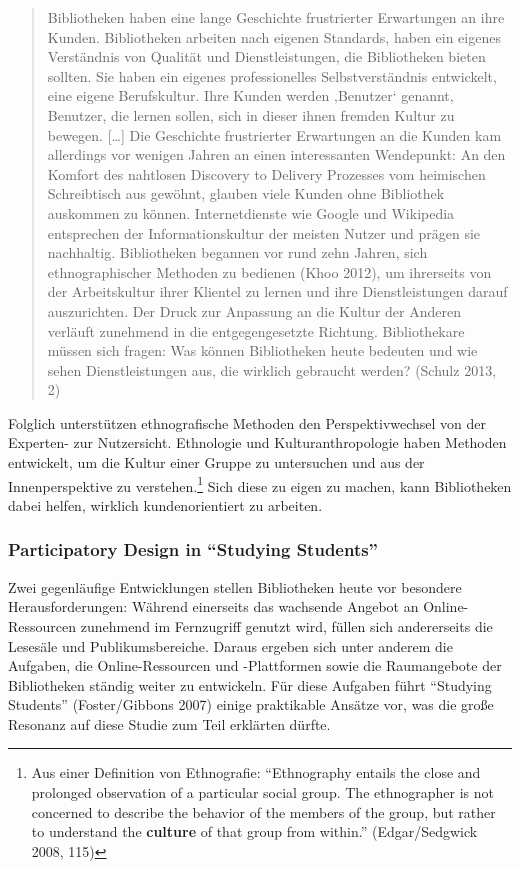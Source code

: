 \documentclass[a4paper,
fontsize=11pt,
oneside,
numbers=noperiodatend,
parskip=half-,
bibliography=totoc,
final
]{scrartcl}
\begin{document}
\begin{quote}
Bibliotheken haben eine lange Geschichte frustrierter Erwartungen an
ihre Kunden. Bibliotheken arbeiten nach eigenen Standards, haben ein
eigenes Verständnis von Qualität und Dienstleistungen, die Bibliotheken
bieten sollten. Sie haben ein eigenes professionelles Selbstverständnis
entwickelt, eine eigene Berufskultur. Ihre Kunden werden ‚Benutzer`
genannt, Benutzer, die lernen sollen, sich in dieser ihnen fremden
Kultur zu bewegen. {[}\ldots{}{]} Die Geschichte frustrierter
Erwartungen an die Kunden kam allerdings vor wenigen Jahren an einen
interessanten Wendepunkt: An den Komfort des nahtlosen Discovery to
Delivery Prozesses vom heimischen Schreibtisch aus gewöhnt, glauben
viele Kunden ohne Bibliothek auskommen zu können. Internetdienste wie
Google und Wikipedia entsprechen der Informationskultur der meisten
Nutzer und prägen sie nachhaltig. Bibliotheken begannen vor rund zehn
Jahren, sich ethnographischer Methoden zu bedienen (Khoo 2012), um
ihrerseits von der Arbeitskultur ihrer Klientel zu lernen und ihre
Dienstleistungen darauf auszurichten. Der Druck zur Anpassung an die
Kultur der Anderen verläuft zunehmend in die entgegengesetzte Richtung.
Bibliothekare müssen sich fragen: Was können Bibliotheken heute bedeuten
und wie sehen Dienstleistungen aus, die wirklich gebraucht werden?
(Schulz 2013, 2)
\end{quote}

Folglich unterstützen ethnografische Methoden den Perspektivwechsel von
der Experten- zur Nutzersicht. Ethnologie und Kulturanthropologie haben
Methoden entwickelt, um die Kultur einer Gruppe zu untersuchen und aus
der Innenperspektive zu verstehen.\footnote{Aus einer Definition von
  Ethnografie: \enquote{Ethnography entails the close and prolonged
  observation of a particular social group. The ethnographer is not
  concerned to describe the behavior of the members of the group, but
  rather to understand the \textbf{culture} of that group from within.}
  (Edgar/Sedgwick 2008, 115)} Sich diese zu eigen zu machen, kann
Bibliotheken dabei helfen, wirklich kundenorientiert zu arbeiten.

\subsubsection{Participatory Design in \enquote{Studying
Students}}\label{participatory-design-in-studying-students}

Zwei gegenläufige Entwicklungen stellen Bibliotheken heute vor besondere
Herausforderungen: Während einerseits das wachsende Angebot an
Online-Ressourcen zunehmend im Fernzugriff genutzt wird, füllen sich
andererseits die Lesesäle und Publikumsbereiche. Daraus ergeben sich
unter anderem die Aufgaben, die Online-Ressourcen und -Plattformen sowie
die Raumangebote der Bibliotheken ständig weiter zu entwickeln. Für
diese Aufgaben führt \enquote{Studying Students} (Foster/Gibbons 2007)
einige praktikable Ansätze vor, was die große Resonanz auf diese Studie
zum Teil erklärten dürfte.
\end{document}
